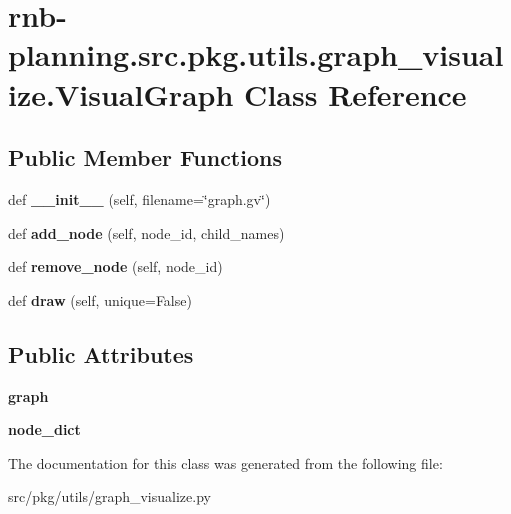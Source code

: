 \hypertarget{classrnb-planning_1_1src_1_1pkg_1_1utils_1_1graph__visualize_1_1_visual_graph}{}\section{rnb-\/planning.src.\+pkg.\+utils.\+graph\+\_\+visualize.\+Visual\+Graph Class Reference}
\label{classrnb-planning_1_1src_1_1pkg_1_1utils_1_1graph__visualize_1_1_visual_graph}
\subsection*{Public Member Functions}
\begin{DoxyCompactItemize}
\item 
\mbox{\label{classrnb-planning_1_1src_1_1pkg_1_1utils_1_1graph__visualize_1_1_visual_graph_a81f37a43e2bbcf9733a9ad1693c42801}} 
def {\bfseries \+\_\+\+\_\+init\+\_\+\+\_\+} (self, filename=\char`\"{}graph.\+gv\char`\"{})
\item 
\mbox{\label{classrnb-planning_1_1src_1_1pkg_1_1utils_1_1graph__visualize_1_1_visual_graph_a5017bdd0be0245090f844c6dfb0229ef}} 
def {\bfseries add\+\_\+node} (self, node\+\_\+id, child\+\_\+names)
\item 
\mbox{\label{classrnb-planning_1_1src_1_1pkg_1_1utils_1_1graph__visualize_1_1_visual_graph_acd5c244dd24fecd2ec9f8cc432f1f9cf}} 
def {\bfseries remove\+\_\+node} (self, node\+\_\+id)
\item 
\mbox{\label{classrnb-planning_1_1src_1_1pkg_1_1utils_1_1graph__visualize_1_1_visual_graph_a655b0343f1f30048fcb9b7a37403917a}} 
def {\bfseries draw} (self, unique=False)
\end{DoxyCompactItemize}
\subsection*{Public Attributes}
\begin{DoxyCompactItemize}
\item 
\mbox{\label{classrnb-planning_1_1src_1_1pkg_1_1utils_1_1graph__visualize_1_1_visual_graph_a5dd53da3c95c6426aa79fddb2cd255c5}} 
{\bfseries graph}
\item 
\mbox{\label{classrnb-planning_1_1src_1_1pkg_1_1utils_1_1graph__visualize_1_1_visual_graph_a94542d479ce379cd6e91c73afbad0baa}} 
{\bfseries node\+\_\+dict}
\end{DoxyCompactItemize}


The documentation for this class was generated from the following file\+:\begin{DoxyCompactItemize}
\item 
src/pkg/utils/graph\+\_\+visualize.\+py\end{DoxyCompactItemize}

